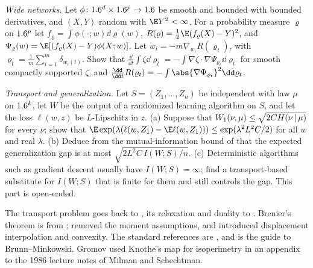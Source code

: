 \begin{refsection}
\begin{exercises}
\item \transfer\label{ex:transport:meanfield} \emph{Wide networks.} Let $\phi\colon1.6^d\times1.6^p\to1.6$ be smooth and bounded with bounded derivatives, and $(X,Y)$ random with $\E Y^2<\infty$. For a probability measure $\varrho$ on $1.6^p$ let $f_\varrho=\int\phi(\cdot;w)\dd\varrho(w)$, $R(\varrho)=\frac12\E(f_\varrho(X)-Y)^2$, and $\Psi_\varrho(w)=\E[(f_\varrho(X)-Y)\phi(X;w)]$. Let $\dot w_i=-m\nabla_{w_i}R(\varrho_t)$, with $\varrho_t=\frac1m\sum_{i=1}^m\delta_{w_i(t)}$. Show that $\frac{\dd}{\dd t}\int\zeta\dd\varrho_t=-\int\nabla\zeta\cdot\nabla\Psi_{\varrho_t}\dd\varrho_t$ for smooth compactly supported $\zeta$, and $\frac{\dd}{\dd t}R(\varrho_t)=-\int\abs{\nabla\Psi_{\varrho_t}}^2\dd\varrho_t$.

\item \research\harder\label{ex:transport:generalization} \emph{Transport and generalization.} Let $S=(Z_1,\dots,Z_n)$ be independent with law $\mu$ on $1.6^k$, let $W$ be the output of a randomized learning algorithm on $S$, and let the loss $\ell(w,z)$ be $L$-Lipschitz in $z$. (a) Suppose that $W_1(\nu,\mu)\le\sqrt{2CH(\nu\,|\,\mu)}$ for every $\nu$; show that $\E\exp(\lambda(\ell(w,Z_1)-\E\ell(w,Z_1)))\le\exp(\lambda^2L^2C/2)$ for all $w$ and real $\lambda$. (b) Deduce from the mutual-information bound of \textcite{XuRaginsky2017} that the expected generalization gap is at most $\sqrt{2L^2C\,I(W;S)/n}$. (c) Deterministic algorithms such as gradient descent usually have $I(W;S)=\infty$; find a transport-based substitute for $I(W;S)$ that is finite for them and still controls the gap. This part is open-ended. 
\end{exercises}

\notesandrefs

The transport problem goes back to \textcite{Monge1781}, its relaxation and duality to \textcite{Kantorovich1942}. Brenier's theorem is from \textcite{Brenier1991}; \textcite{McCann1995} removed the moment assumptions, and \textcite{McCann1997} introduced displacement interpolation and convexity. The standard references are \textcite{Villani2003,Villani2009}, and \textcite{Gardner2002} is the guide to Brunn--Minkowski. Gromov used Knothe's map for isoperimetry in an appendix to the 1986 lecture notes of Milman and Schechtman.


\end{refsection}
